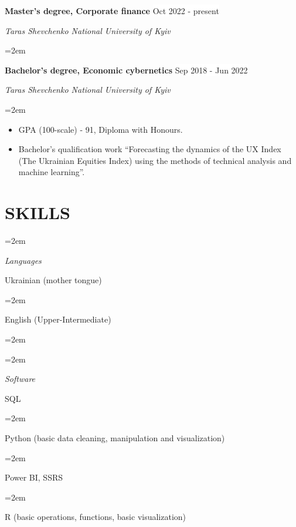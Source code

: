 \documentclass[paper=a4,fontsize=11pt]{scrartcl} %
\newlength{\spacebox}
\newcommand{\sepspace}{\vspace*{1em}}		%
\newcommand{\NewPart}[1]{\section*{\uppercase{#1}}}
\newcommand{\PersonalEntry}[2]{
		\noindent\hangindent=2em\hangafter=0 %
		\parbox{\spacebox}{        %
		\textit{#1}}		       %
		\hspace{1.5em} #2 \par}    %
\newcommand{\SkillsEntry}[2]{      %
		\noindent\hangindent=2em\hangafter=0 %
		\parbox{\spacebox}{        %
		\textit{#1}}			   %
		\hspace{1.5em} #2 \par}    %
\newcommand{\EducationEntry}[4]{
		\noindent \textbf{#1} \hfill      %
        \colorbox{White}{\color{Black}#2} \par  %
		\noindent \textit{#3} \par        %
		\noindent\hangindent=2em\hangafter=0 \small #4 %
		\normalsize \par}
\begin{document}
\EducationEntry{Master's degree, Corporate finance}{Oct 2022 - present}{Taras Shevchenko National University of Kyiv}
\sepspace

\EducationEntry{Bachelor's degree, Economic cybernetics}{Sep 2018 - Jun 2022}{Taras Shevchenko National University of Kyiv}{\begin{itemize} \setlength{\itemsep}{0pt} \item[\textcolor{white}{\textbullet}]  GPA (100-scale) - 91, Diploma with Honours. \item[\textcolor{white}{\textbullet}] Bachelor's qualification work “Forecasting the dynamics of the UX Index (The Ukrainian Equities Index) using the methods of technical analysis and machine learning”.\end{itemize}}

\NewPart{Skills}{}

\SkillsEntry{Languages}{Ukrainian (mother tongue)}
\SkillsEntry{}{English (Upper-Intermediate)}
\SkillsEntry{}{}
\SkillsEntry{Software}{SQL}
\SkillsEntry{}{Python (basic data cleaning, manipulation and visualization)}
\SkillsEntry{}{Power BI, SSRS}
\SkillsEntry{}{R (basic operations, functions, basic visualization)}
\end{document}
